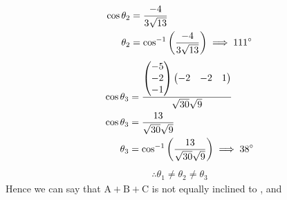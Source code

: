 \documentclass[11pt]{book}
\begin{document}
\begin{enumerate}
\begin{align}
    \cos{\theta_2}&=\frac{-4}{3\sqrt{13}}\\
    \theta_2&=\cos^{-1}\left(\frac{-4}{3\sqrt{13}}\right)
    \implies 111\degree
\end{align}
\begin{align}
    \cos{\theta_3}&=\frac{\begin{pmatrix}-5 \\-2 \\-1\end{pmatrix}\begin{pmatrix}-2&-2&1\end{pmatrix}}{\sqrt{30}\sqrt{9}}\\
    \cos{\theta_3}&=\frac{13}{\sqrt{30}\sqrt{9}}\\
    \theta_3&=\cos^{-1}\left(\frac{13}{\sqrt{30}\sqrt{9}}\right)
    \implies 38\degree
\end{align}
\begin{align*}
    \therefore  \theta_1\neq\theta_2\neq\theta_3
\end{align*}
Hence  we can say that $\text{A}+\text{B}+\text{C} $ is not equally inclined to , and     \end{enumerate}
\end{document}
